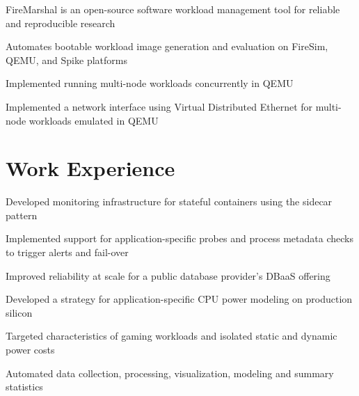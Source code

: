 \documentclass[]{deedy-resume-openfont}
\begin{document}
\begin{tightemize}
{\normalsize
\item FireMarshal is an open-source software workload management tool for reliable and reproducible research 
\item Automates bootable workload image generation and evaluation on FireSim, QEMU, and Spike platforms
\item Implemented running multi-node workloads concurrently in QEMU
\item Implemented a network interface using Virtual Distributed Ethernet for multi-node workloads emulated in QEMU
}
\end{tightemize}


\sectionsep

\section{Work Experience}
\vspace{\topsep} %
{\normalsize
\begin{tightemize}
\item Developed monitoring infrastructure for stateful containers using the sidecar pattern
\item Implemented support for application-specific probes and process metadata checks to trigger alerts and fail-over
\item Improved reliability at scale for a public database provider's DBaaS offering
\end{tightemize}
}

\vspace{\topsep}
\vspace{\topsep} %
{\normalsize
\begin{tightemize}
\item Developed a strategy for application-specific CPU power modeling on production silicon
\item Targeted characteristics of gaming workloads and isolated static and dynamic power costs
\item Automated data collection, processing, visualization, modeling and summary statistics
\end{tightemize}
}
\sectionsep
\end{document}
